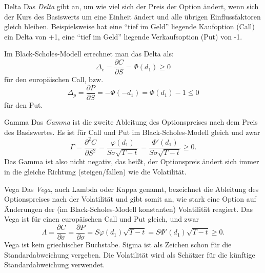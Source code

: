 \begin{bonus}[Griechen]{Delta}
    Das \emph{Delta} gibt an, um wie viel sich der Preis der Option ändert, wenn sich der Kurs des Basiswerts um eine Einheit ändert und alle übrigen Einflussfaktoren gleich bleiben. Beispielsweise hat eine \enquote{tief im Geld} liegende Kaufoption (Call) ein Delta von +1, eine \enquote{tief im Geld} liegende Verkaufsoption (Put) von -1.

    Im Black-Scholes-Modell errechnet man das Delta als:
    \[
        \Delta _{c}={\frac {\partial C}{\partial S}}=\Phi (d_{1})\geq 0
    \]
    für den europäischen Call, bzw.
    \[
        \Delta _{p}={\frac {\partial P}{\partial S}}=-\Phi (-d_{1})=\Phi (d_{1})-1\leq 0
    \]
    für den Put.
\end{bonus}

\begin{bonus}[Griechen]{Gamma}
    Das \emph{Gamma} ist die zweite Ableitung des Optionspreises nach dem Preis des Basiswertes.
    Es ist für Call und Put im Black-Scholes-Modell gleich und zwar
    \[
        \Gamma ={\frac {\partial ^{2}C}{\partial S^{2}}}={\frac {\varphi (d_{1})}{S\sigma {\sqrt {T-t}}}}={\frac {\Phi '(d_{1})}{S\sigma {\sqrt {T-t}}}}\geq 0.
    \]
    Das Gamma ist also nicht negativ, das heißt, der Optionspreis ändert sich immer in die gleiche Richtung (steigen/fallen) wie die Volatilität.
\end{bonus}

\begin{bonus}[Griechen]{Vega}
    Das \emph{Vega}, auch Lambda oder Kappa genannt, bezeichnet die Ableitung des Optionspreises nach der Volatilität und gibt somit an, wie stark eine Option auf Änderungen der (im Black-Scholes-Modell konstanten) Volatilität reagiert. Das Vega ist für einen europäischen Call und Put gleich, und zwar
    \[
        \Lambda ={\frac {\partial C}{\partial \sigma }}={\frac {\partial P}{\partial \sigma }}=S\varphi (d_{1}){\sqrt {T-t}}=S\Phi '(d_{1}){\sqrt {T-t}}\geq 0.
    \]
    Vega ist kein griechischer Buchstabe.
    Sigma ist als Zeichen schon für die Standardabweichung vergeben. Die Volatilität wird als Schätzer für die künftige Standardabweichung verwendet.
\end{bonus}

